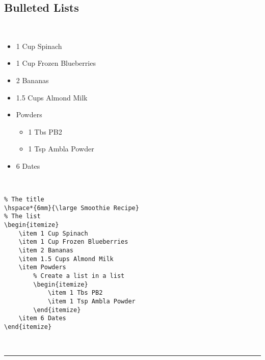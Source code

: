 \documentclass[a4paper,12pt,titlepage]{article}
\begin{document}
\subsection{Bulleted Lists}\hspace*{\fill}
\\
\hspace*{6mm}{\large Smoothie Recipe}
\begin{itemize}[leftmargin=+.7in]
	\item 1 Cup Spinach
	\item 1 Cup Frozen Blueberries
	\item 2 Bananas
	\item 1.5 Cups Almond Milk
	\item Powders
	\begin{itemize}
		\item 1 Tbs PB2
		\item 1 Tsp Ambla Powder
	\end{itemize}
	\item 6 Dates
\end{itemize}
~\\
\begin{minipage}{\linewidth}
\begin{lstlisting}
% The title
\hspace*{6mm}{\large Smoothie Recipe}
% The list
\begin{itemize}
	\item 1 Cup Spinach
	\item 1 Cup Frozen Blueberries
	\item 2 Bananas
	\item 1.5 Cups Almond Milk
	\item Powders
		% Create a list in a list
		\begin{itemize}
			\item 1 Tbs PB2
			\item 1 Tsp Ambla Powder
		\end{itemize}
	\item 6 Dates
\end{itemize}
\end{lstlisting}
\end{minipage}
~\\
\rule{\linewidth}{0.1mm}



\end{document}

